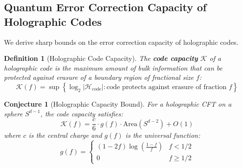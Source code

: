 \documentclass[12pt,a4paper]{article}
\newtheorem{conjecture}[theorem]{Conjecture}
\newtheorem{definition}[theorem]{Definition}
\begin{document}
\subsection{Quantum Error Correction Capacity of Holographic Codes}

We derive sharp bounds on the error correction capacity of holographic codes.

\begin{definition}[Holographic Code Capacity]
The \textbf{code capacity} $\mathcal{K}$ of a holographic code is the maximum amount of bulk information that can be protected against erasure of a boundary region of fractional size $f$:
\begin{equation}
\mathcal{K}(f) = \sup \left\{ \log_2 |\mathcal{H}_{\text{code}}| : \text{code protects against erasure of fraction } f \right\}
\end{equation}
\end{definition}

\begin{conjecture}[Holographic Capacity Bound]
For a holographic CFT on a sphere $S^{d-1}$, the code capacity satisfies:
\begin{equation}
\mathcal{K}(f) = \frac{c}{6} \cdot g(f) \cdot \text{Area}(S^{d-2}) + O(1)
\end{equation}
where $c$ is the central charge and $g(f)$ is the universal function:
\begin{equation}
g(f) = \begin{cases}
(1-2f) \log\left(\frac{1-f}{f}\right) & f < 1/2 \\
0 & f \geq 1/2
\end{cases}
\end{equation}
\end{conjecture}
\end{document}
